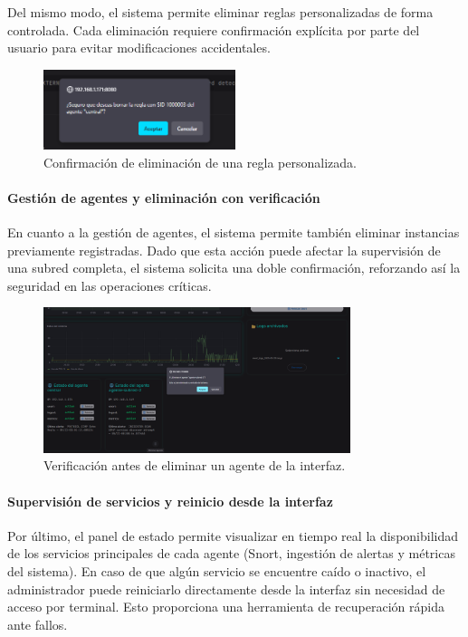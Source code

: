 \documentclass[11pt,a4paper,twoside]{report}
\begin{document}
Del mismo modo, el sistema permite eliminar reglas personalizadas de forma controlada. Cada eliminación requiere confirmación explícita por parte del usuario para evitar modificaciones accidentales.

\begin{figure}[H]
	\centering
	\includegraphics[width=0.5\textwidth]{pruebas/7.png}
	\caption{Confirmación de eliminación de una regla personalizada.}
	\label{fig:eliminar_regla}
\end{figure}

\paragraph{Gestión de agentes y eliminación con verificación}

En cuanto a la gestión de agentes, el sistema permite también eliminar instancias previamente registradas. Dado que esta acción puede afectar la supervisión de una subred completa, el sistema solicita una doble confirmación, reforzando así la seguridad en las operaciones críticas.

\begin{figure}[H]
	\centering
	\includegraphics[width=0.8\textwidth]{pruebas/8.png}
	\caption{Verificación antes de eliminar un agente de la interfaz.}
	\label{fig:eliminar_agente}
\end{figure}

\paragraph{Supervisión de servicios y reinicio desde la interfaz}

Por último, el panel de estado permite visualizar en tiempo real la disponibilidad de los servicios principales de cada agente (Snort, ingestión de alertas y métricas del sistema). En caso de que algún servicio se encuentre caído o inactivo, el administrador puede reiniciarlo directamente desde la interfaz sin necesidad de acceso por terminal. Esto proporciona una herramienta de recuperación rápida ante fallos.
\end{document}
